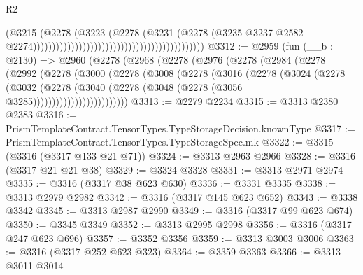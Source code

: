 \begin{lexlean}{R2}
\begin{coremodule}
                                                                                (@3215
                                                                                  (@2278
                                                                                    (@3223
                                                                                      (@2278
                                                                                        (@3231
                                                                                          (@2278
                                                                                            (@3235
                                                                                              @3237
                                                                                              @2582
                                                                                              @2274)))))))))))))))))))))))))))))))))))))))))))))
@3312 := @2959
    (fun (__b : @2130) =>
    @2960
      (@2278
        (@2968
          (@2278
            (@2976
              (@2278
                (@2984
                  (@2278
                    (@2992
                      (@2278
                        (@3000
                          (@2278
                            (@3008
                              (@2278
                                (@3016
                                  (@2278
                                    (@3024
                                      (@2278
                                        (@3032
                                          (@2278
                                            (@3040
                                              (@2278
                                                (@3048 (@2278 (@3056 @3285)))))))))))))))))))))))))
@3313 := @2279 @2234
@3315 := @3313 @2380 @2383
@3316 := PrismTemplateContract.TensorTypes.TypeStorageDecision.knownType
@3317 := PrismTemplateContract.TensorTypes.TypeStorageSpec.mk
@3322 := @3315 (@3316 (@3317 @133 @21 @71))
@3324 := @3313 @2963 @2966
@3328 := @3316 (@3317 @21 @21 @38)
@3329 := @3324 @3328
@3331 := @3313 @2971 @2974
@3335 := @3316 (@3317 @38 @623 @630)
@3336 := @3331 @3335
@3338 := @3313 @2979 @2982
@3342 := @3316 (@3317 @145 @623 @652)
@3343 := @3338 @3342
@3345 := @3313 @2987 @2990
@3349 := @3316 (@3317 @99 @623 @674)
@3350 := @3345 @3349
@3352 := @3313 @2995 @2998
@3356 := @3316 (@3317 @247 @623 @696)
@3357 := @3352 @3356
@3359 := @3313 @3003 @3006
@3363 := @3316 (@3317 @252 @623 @323)
@3364 := @3359 @3363
@3366 := @3313 @3011 @3014

\end{coremodule}
\end{lexlean}
